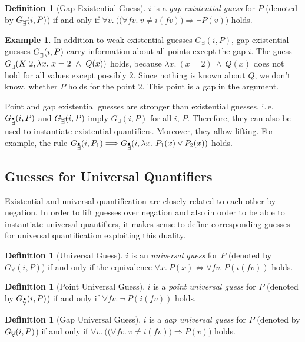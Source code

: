 \documentclass[a4paper,12pt,DIV=12,oneside]{scrbook}
\newcommand{\fv}{\textit{fv}}
\theoremstyle{definition}
\newtheorem{definition}[lemma]{Definition}
\newtheorem{example}[lemma]{Example}
\theoremstyle{remark}
\newcommand{\GE}{\ensuremath{G_\exists}}
\newcommand{\GEP}{\ensuremath{G_{\accentset{\bullet}{\exists}}}}
\newcommand{\GEG}{\ensuremath{G_{\accentset{\_\,\_}{\exists}}}}
\newcommand{\GU}{\ensuremath{G_\forall}}
\newcommand{\GUP}{\ensuremath{G_{\accentset{\bullet}{\forall}}}}
\newcommand{\GUG}{\ensuremath{G_{\accentset{\_\,\_}{\forall}}}}
\begin{document}
\begin{definition}[Gap Existential Guess]
  $i$ is a \emph{gap existential guess} for $P$ (denoted by $\GEG(i, P)$)
  if and only if $\forall v.\ \big(\big(\forall \fv.\ v \neq
  i(\fv)\big) \Longrightarrow \neg P(v)\big)$ holds.
\end{definition}

\begin{example}
In addition to weak existential guesses $\GE(i,P)$, gap existential
guesses $\GEG(i,P)$ carry information about all points except the gap $i$.
The guess $\GEG(K\ 2, \lambda x.\ x = 2\ \wedge\ Q(x))$ holds, because $\lambda x.\ (x = 2)\ \wedge\ Q(x)$
does not hold for all values except possibly $2$. Since nothing is known about $Q$, we don't know,
whether $P$ holds for the point $2$. This point is a gap in the argument.
\end{example}

\noindent
Point and gap existential guesses are stronger than existential
guesses, i.\,e.\ $\GEP(i, P)$ and $\GEG(i, P)$ imply $\GE(i, P)$ for
all $i$, $P$. Therefore, they can also be used to instantiate
existential quantifiers.  Moreover, they allow lifting. For example,
the rule $\GEP(i, P_1) \Longrightarrow \GEP(i, \lambda x.\ P_1(x) \vee
P_2(x))$ holds.

\subsection{Guesses for Universal Quantifiers}

Existential and universal quantification are closely related to each
other by negation. In order to lift guesses over negation and also in
order to be able to instantiate universal quantifiers, it makes sense
to define corresponding guesses for universal quantification
exploiting this duality.

\begin{definition}[Universal Guess]
  $i$ is an \emph{universal guess} for $P$ (denoted by $\GU(i, P)$)
  if and only if the equivalence $\forall x.\ P(x) \Longleftrightarrow
  \forall \fv.\ P(i(\fv))$ holds.
\end{definition}

\begin{definition}[Point Universal Guess]
$i$ is a \emph{point universal guess} for $P$ (denoted by $\GUP(i, P)$) if and only if $\forall \fv.\ \neg\ P(i(\fv))$ holds.
\end{definition}

\begin{definition}[Gap Universal Guess]
  $i$ is a \emph{gap universal guess} for $P$ (denoted by $\GUG(i,
  P)$) if and only if $\forall v.\ \big(\big(\forall \fv.\ v \neq
  i(\fv)\big) \Longrightarrow P(v)\big)$ holds.
\end{definition}
\end{document}
